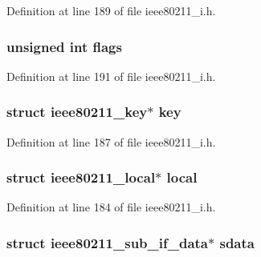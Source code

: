 Definition at line 189 of file ieee80211\-\_\-i.\-h.

\hypertarget{structieee80211__tx__data_ac92588540e8c1d014a08cd8a45462b19}{
\subsubsection[{flags}]{\setlength{\rightskip}{0pt plus 5cm}unsigned int flags}}\label{structieee80211__tx__data_ac92588540e8c1d014a08cd8a45462b19}


Definition at line 191 of file ieee80211\-\_\-i.\-h.

\hypertarget{structieee80211__tx__data_a6fb9dce4966e6727c301a63b8185c388}{
\subsubsection[{key}]{\setlength{\rightskip}{0pt plus 5cm}struct {\bf ieee80211\-\_\-key}$\ast$ key}}\label{structieee80211__tx__data_a6fb9dce4966e6727c301a63b8185c388}


Definition at line 187 of file ieee80211\-\_\-i.\-h.

\hypertarget{structieee80211__tx__data_ad436a024f420f219c4fe2eebce7e4ab2}{
\subsubsection[{local}]{\setlength{\rightskip}{0pt plus 5cm}struct {\bf ieee80211\-\_\-local}$\ast$ local}}\label{structieee80211__tx__data_ad436a024f420f219c4fe2eebce7e4ab2}


Definition at line 184 of file ieee80211\-\_\-i.\-h.

\hypertarget{structieee80211__tx__data_ad829d8d33f06a7245cc303f924f259ac}{
\subsubsection[{sdata}]{\setlength{\rightskip}{0pt plus 5cm}struct {\bf ieee80211\-\_\-sub\-\_\-if\-\_\-data}$\ast$ sdata}}\label{structieee80211__tx__data_ad829d8d33f06a7245cc303f924f259ac}


